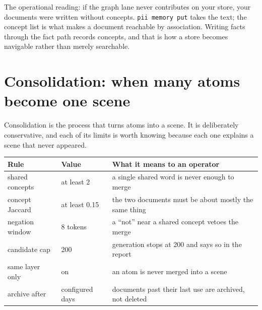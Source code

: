 \begin{center}
\end{center}

The operational reading: if the graph lane never contributes on your store, your documents were
written without concepts. \texttt{pii memory put} takes the text; the concept list is what makes a
document reachable by association. Writing facts through the fact path records concepts, and that
is how a store becomes navigable rather than merely searchable.

\section{Consolidation: when many atoms become one scene}

Consolidation is the process that turns atoms into a scene. It is deliberately conservative, and
each of its limits is worth knowing because each one explains a scene that never appeared.

\begin{longtable}{@{}p{}p{}p{}@{}}
  \toprule
  \textbf{Rule} & \textbf{Value} & \textbf{What it means to an operator} \\
  \midrule
  \endhead
  shared concepts & at least 2 & a single shared word is never enough to merge \\
  concept Jaccard & at least 0.15 & the two documents must be about mostly the same thing \\
  negation window & 8 tokens & a ``not'' near a shared concept vetoes the merge \\
  candidate cap & 200 & generation stops at 200 and says so in the report \\
  same layer only & on & an atom is never merged into a scene \\
  archive after & configured days & documents past their last use are archived, not deleted \\
  \bottomrule
\end{longtable}

